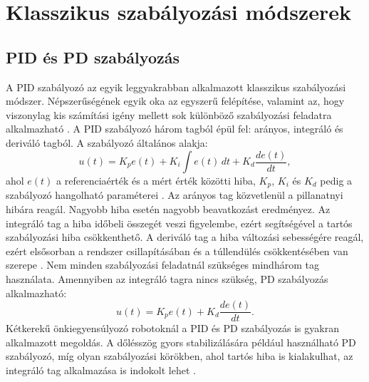 \documentclass[12pt,a4paper]{report}
\begin{document}
	\section{Klasszikus szabályozási módszerek}
	\subsection{PID és PD szabályozás}
	A PID szabályozó az egyik leggyakrabban alkalmazott klasszikus szabályozási módszer. Népszerűségének egyik oka az egyszerű felépítése, valamint az, hogy viszonylag kis számítási igény mellett sok különböző szabályozási feladatra alkalmazható \cite{ang2005,zhangnor2025}.
	\newline
	\newline
	A PID szabályozó három tagból épül fel: arányos, integráló és deriváló tagból. A szabályozó általános alakja:
	\begin{equation}
		u(t)
		=
		K_p e(t)
		+
		K_i \int e(t)\,dt
		+
		K_d \frac{de(t)}{dt},
	\end{equation}
	ahol $e(t)$ a referenciaérték és a mért érték közötti hiba, $K_p$, $K_i$ és $K_d$ pedig a szabályozó hangolható paraméterei \cite{ang2005}.
	\newline
	\newline
	Az arányos tag közvetlenül a pillanatnyi hibára reagál. Nagyobb hiba esetén nagyobb beavatkozást eredményez. Az integráló tag a hiba időbeli összegét veszi figyelembe, ezért segítségével a tartós szabályozási hiba csökkenthető. A deriváló tag a hiba változási sebességére reagál, ezért elsősorban a rendszer csillapításában és a túllendülés csökkentésében van szerepe \cite{ang2005}.
	\newline
	\newline
	Nem minden szabályozási feladatnál szükséges mindhárom tag használata. Amennyiben az integráló tagra nincs szükség, PD szabályozás alkalmazható:
	\begin{equation}
		u(t)
		=
		K_p e(t)
		+
		K_d \frac{de(t)}{dt}.
	\end{equation}
	Kétkerekű önkiegyensúlyozó robotoknál a PID és PD szabályozás is gyakran alkalmazott megoldás. A dőlésszög gyors stabilizálására például használható PD szabályozó, míg olyan szabályozási körökben, ahol tartós hiba is kialakulhat, az integráló tag alkalmazása is indokolt lehet \cite{zhangnor2025}.
\end{document}
